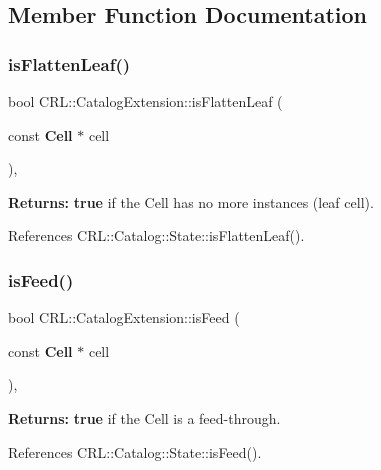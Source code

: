 \subsection{Member Function Documentation}
\mbox{\label{classCRL_1_1CatalogExtension_af6487fb6007e34163773d8e8d15013a1}} 
\subsubsection{\texorpdfstring{is\+Flatten\+Leaf()}{isFlattenLeaf()}}
{\footnotesize\ttfamily bool C\+R\+L\+::\+Catalog\+Extension\+::is\+Flatten\+Leaf (\begin{DoxyParamCaption}\item[{const \textbf{ Cell} $\ast$}]{cell }\end{DoxyParamCaption})\hspace{0.3cm}{\ttfamily [inline]}, {\ttfamily [static]}}

{\bfseries Returns\+:} {\bfseries true} if the Cell has no more instances (leaf cell). 

References C\+R\+L\+::\+Catalog\+::\+State\+::is\+Flatten\+Leaf().

\mbox{\label{classCRL_1_1CatalogExtension_a5feda5d6fba490a71e3742361ec7b4a1}} 
\subsubsection{\texorpdfstring{is\+Feed()}{isFeed()}}
{\footnotesize\ttfamily bool C\+R\+L\+::\+Catalog\+Extension\+::is\+Feed (\begin{DoxyParamCaption}\item[{const \textbf{ Cell} $\ast$}]{cell }\end{DoxyParamCaption})\hspace{0.3cm}{\ttfamily [inline]}, {\ttfamily [static]}}

{\bfseries Returns\+:} {\bfseries true} if the Cell is a feed-\/through. 

References C\+R\+L\+::\+Catalog\+::\+State\+::is\+Feed().

